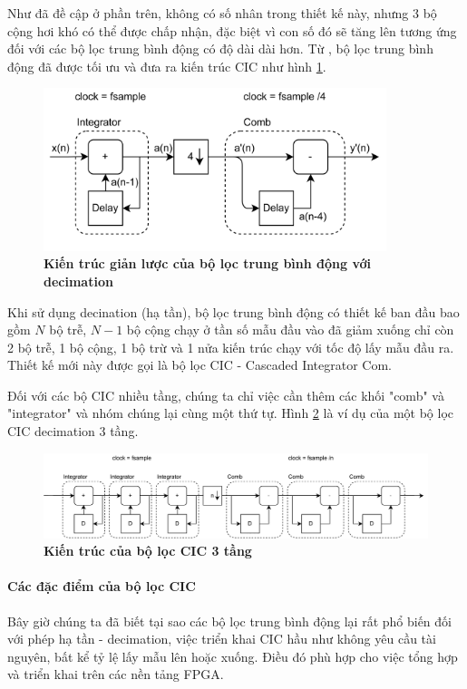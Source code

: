 Như đã đề cập ở phần trên, không có số nhân trong thiết kế này, nhưng 3 bộ cộng hơi khó có thể được chấp nhận, đặc biệt vì con số đó sẽ tăng lên tương ứng đối với các bộ lọc trung bình động có độ dài dài hơn. Từ \cite{cic_opt}, bộ lọc trung bình động đã được tối ưu và đưa ra kiến trúc CIC như hình \ref{cic_7}.

\begin{figure}[H]
    \centering
    \includegraphics[width=10cm]{Images/Chuong2/cic/cic_7.png}
    \caption[Kiến trúc giản lược của bộ lọc trung bình động với decimation]{\bfseries \fontsize{12pt}{0pt}\selectfont Kiến trúc giản lược của bộ lọc trung bình động với decimation}
    \label{cic_7}
\end{figure}

Khi sử dụng decination (hạ tần), bộ lọc trung bình động có thiết kế ban đầu bao gồm $N$ bộ trễ, $N-1$ bộ cộng chạy ở tần số mẫu đầu vào đã giảm xuống chỉ còn 2 bộ trễ, 1 bộ cộng, 1 bộ trừ và 1 nửa kiến trúc chạy với tốc độ lấy mẫu đầu ra. Thiết kế mới này được gọi là bộ lọc CIC - Cascaded Integrator Com.

Đối với các bộ CIC nhiều tầng, chúng ta chỉ việc cần thêm các khối "comb" và "integrator" và nhóm chúng lại cùng một thứ tự. Hình \ref{cic_8} là ví dụ của một bộ lọc CIC decimation 3 tầng.
\begin{figure}[H]
    \centering
    \includegraphics[width=14cm]{Images/Chuong2/cic/cic_8.png}
    \caption[Kiến trúc của bộ lọc CIC 3 tầng ]{\bfseries \fontsize{12pt}{0pt}\selectfont Kiến trúc của bộ lọc CIC 3 tầng}
    \label{cic_8}
\end{figure}
\paragraph{Các đặc điểm của bộ lọc CIC}
Bây giờ chúng ta đã biết tại sao các bộ lọc trung bình động lại rất phổ biến đối với phép hạ tần - decimation, việc triển khai CIC hầu như không yêu cầu tài nguyên, bất kể tỷ lệ lấy mẫu lên hoặc xuống. Điều đó phù hợp cho việc tổng hợp và triển khai trên các nền tảng FPGA.

